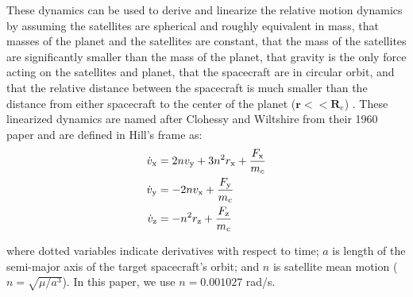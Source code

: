 \documentclass[twocolumn,letterpaper]{IEEEAerospaceCLS}  %
\theoremstyle{definition}
\begin{document}
These dynamics can be used to derive and linearize the relative motion dynamics by assuming the satellites are spherical and roughly equivalent in mass, that masses of the planet and the satellites are constant, that the mass of the satellites are significantly smaller than the mass of the planet, that gravity is the only force acting on the satellites and planet, that the spacecraft are in circular orbit, and that the relative distance between the spacecraft is much smaller than the distance from either spacecraft to the center of the planet ($\boldsymbol{r} << \boldsymbol{R}_e$) \cite{clohessy1960terminal}. These linearized dynamics are named after Clohessy and Wiltshire from their 1960 paper \cite{clohessy1960terminal} and are defined in Hill's frame as:
\begin{equation} \label{eq: CWH full}
\begin{split}
\dot{v}_{\rm x} &=2n {v}_{\rm y} + 3n^2 r_{\rm x} +\frac{ F_{\rm x}}{m_c} \\
\dot{v}_{\rm y} &=-2n {v}_{\rm x} +\frac{ F_{\rm y}}{m_c} \\
\dot{v}_{\rm z} &=-n^2 r_{\rm z} + \frac{F_{\rm z}}{m_c}\\
\end{split}
\end{equation}

\noindent
where 
dotted variables indicate derivatives with respect to time;
$a$ is length of the semi-major axis of the target spacecraft's orbit; and $n$ is satellite mean motion ($n=\sqrt{\mu/a^3}$). In this paper, we use $n=0.001027$ rad/s.
% 
\end{document}
